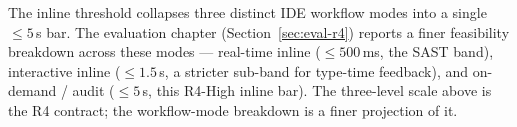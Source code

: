 The inline threshold collapses three distinct IDE workflow modes into a single $\leq 5$\,s bar. The evaluation chapter (Section~\ref{sec:eval-r4}) reports a finer feasibility breakdown across these modes --- real-time inline ($\leq 500$\,ms, the SAST band), interactive inline ($\leq 1.5$\,s, a stricter sub-band for type-time feedback), and on-demand / audit ($\leq 5$\,s, this R4-High inline bar). The three-level scale above is the R4 contract; the workflow-mode breakdown is a finer projection of it.
